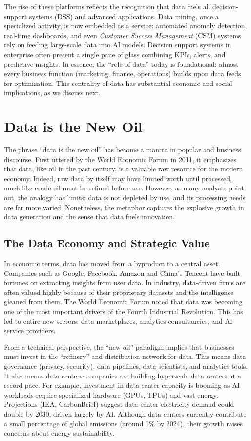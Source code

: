 The rise of these platforms reflects the recognition that data fuels all decision-support systems (DSS) and advanced applications. Data mining, once a specialized activity, is now embedded as a service: automated anomaly detection, real-time dashboards, and even \emph{Customer Success Management} (CSM) systems rely on feeding large-scale data into AI models. Decision support systems in enterprise often present a single pane of glass combining KPIs, alerts, and predictive insights. In essence, the “role of data” today is foundational: almost every business function (marketing, finance, operations) builds upon data feeds for optimization. This centrality of data has substantial economic and social implications, as we discuss next.

\section{Data is the New Oil}
The phrase “data is the new oil” has become a mantra in popular and business discourse. First uttered by the World Economic Forum in 2011, it emphasizes that data, like oil in the past century, is a valuable raw resource for the modern economy. Indeed, raw data by itself may have limited worth until processed, much like crude oil must be refined before use. However, as many analysts point out, the analogy has limits: data is not depleted by use, and its processing needs are far more varied. Nonetheless, the metaphor captures the explosive growth in data generation and the sense that data fuels innovation.

\subsection{The Data Economy and Strategic Value}
In economic terms, data has moved from a byproduct to a central asset. Companies such as Google, Facebook, Amazon and China’s Tencent have built fortunes on extracting insights from user data. In industry, data-driven firms are often valued highly because of their proprietary datasets and the intelligence gleaned from them. The World Economic Forum noted that data was becoming one of the most important drivers of the Fourth Industrial Revolution. This has led to entire new sectors: data marketplaces, analytics consultancies, and AI service providers.

From a technical perspective, the “new oil” paradigm implies that businesses must invest in the “refinery” and distribution network for data. This means data governance (privacy, security), data pipelines, data scientists, and analytics tools. It also means data centers: companies are building hyperscale data centers at a record pace. For example, investment in data center capacity is booming as AI workloads require specialized hardware (GPUs, TPUs) and vast energy. Projections (IEA, CarbonBrief) suggest data center electricity demand could double by 2030, driven largely by AI. Although data centers currently contribute a small percentage of global emissions (around 1\% by 2024), their growth raises concerns about energy sustainability.

